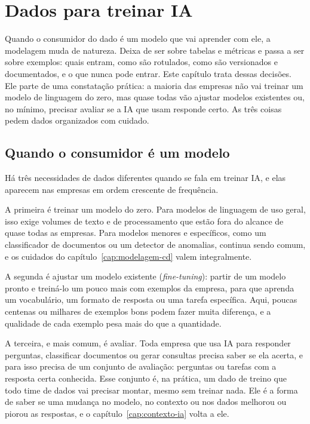 \chapter{Dados para treinar IA}
\label{cap:treinar-ia}

Quando o consumidor do dado é um modelo que vai aprender com ele, a modelagem muda de
natureza. Deixa de ser sobre tabelas e métricas e passa a ser sobre exemplos: quais entram,
como são rotulados, como são versionados e documentados, e o que nunca pode entrar. Este
capítulo trata dessas decisões. Ele parte de uma constatação prática: a maioria das empresas
não vai treinar um modelo de linguagem do zero, mas quase todas vão ajustar modelos
existentes ou, no mínimo, precisar avaliar se a IA que usam responde certo. As três
coisas pedem dados organizados com cuidado.

\section{Quando o consumidor é um modelo}
\label{sec:consumidor-modelo}

Há três necessidades de dados diferentes quando se fala em treinar IA, e elas aparecem nas
empresas em ordem crescente de frequência.

A primeira é treinar um modelo do zero. Para modelos de linguagem de uso geral, isso exige
volumes de texto e de processamento que estão fora do alcance de quase todas as empresas.
Para modelos menores e específicos, como um classificador de documentos ou um detector de
anomalias, continua sendo comum, e os cuidados do capítulo~\ref{cap:modelagem-cd} valem
integralmente.

A segunda é ajustar um modelo existente (\emph{fine-tuning}): partir de um modelo pronto e
treiná-lo um pouco mais com exemplos da empresa, para que aprenda um vocabulário, um formato
de resposta ou uma tarefa específica. Aqui, poucas centenas ou milhares de exemplos bons
podem fazer muita diferença, e a qualidade de cada exemplo pesa mais do que a quantidade.

A terceira, e mais comum, é avaliar. Toda empresa que usa IA para responder perguntas,
classificar documentos ou gerar consultas precisa saber se ela acerta, e para isso precisa de
um conjunto de avaliação: perguntas ou tarefas com a resposta certa conhecida. Esse conjunto
é, na prática, um dado de treino que todo time de dados vai precisar montar, mesmo sem
treinar nada. Ele é a forma de saber se uma mudança no modelo, no contexto ou nos dados
melhorou ou piorou as respostas, e o capítulo~\ref{cap:contexto-ia} volta a ele.

